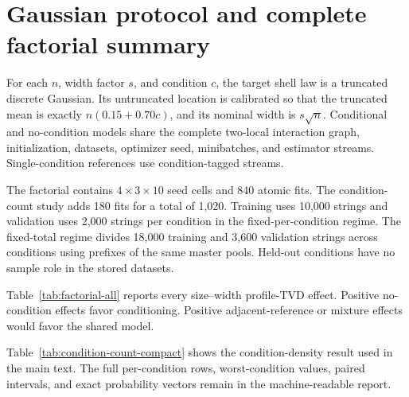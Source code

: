 \section{Gaussian protocol and complete factorial summary}
\label{app:gaussian-protocol}

For each $n$, width factor $s$, and condition $c$, the target shell law is a
truncated discrete Gaussian. Its untruncated location is calibrated so that
the truncated mean is exactly $n(0.15+0.70c)$, and its nominal width is
$s\sqrt n$. Conditional and no-condition models share the complete two-local
interaction graph, initialization, datasets, optimizer seed, minibatches, and
estimator streams. Single-condition references use condition-tagged streams.

The factorial contains $4\times3\times10$ seed cells and 840 atomic fits.
The condition-count study adds 180 fits for a total of 1,020. Training uses
10,000 strings and validation uses 2,000 strings per condition in the
fixed-per-condition regime. The fixed-total regime divides 18,000 training and
3,600 validation strings across conditions using prefixes of the same master
pools. Held-out conditions have no sample role in the stored datasets.

Table~\ref{tab:factorial-all} reports every size--width profile-TVD effect.
Positive no-condition effects favor conditioning. Positive adjacent-reference
or mixture effects would favor the shared model.

\begin{table}[t]
\centering
\scriptsize
\caption{Gaussian factorial profile-TVD effects with paired 95\% bootstrap
intervals. Status letters are S for supported, M for mixed, and U for
unsupported, in the order no-condition, adjacent-reference, mixture.}
\label{tab:factorial-all}
\end{table}

Table~\ref{tab:condition-count-compact} shows the condition-density result
used in the main text. The full per-condition rows, worst-condition values,
paired intervals, and exact probability vectors remain in the machine-readable
report.

\begin{table}[t]
\centering
\small
\caption{Condition-count study at $n=19,s=0.50$. Mean and worst are held-out
profile TVD. The shared model keeps 190 phases and 2,000 updates.}
\label{tab:condition-count-compact}
\end{table}

